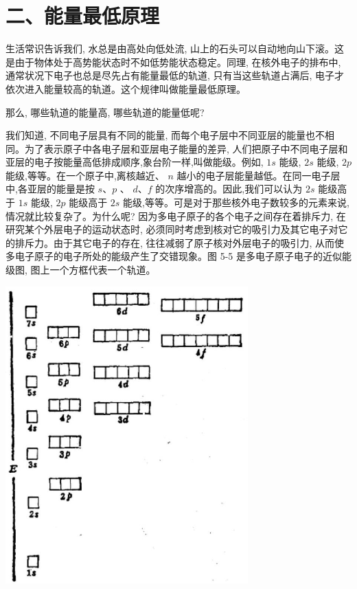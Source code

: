 \documentclass[10pt]{article}
\begin{document}
\section*{二、能量最低原理}

生活常识告诉我们, 水总是由高处向低处流, 山上的石头可以自动地向山下滚。这是由于物体处于高势能状态时不如低势能状态稳定。同理, 在核外电子的排布中, 通常状况下电子也总是尽先占有能量最低的轨道, 只有当这些轨道占满后, 电子才依次进入能量较高的轨道。这个规律叫做能量最低原理。

那么, 哪些轨道的能量高, 哪些轨道的能量低呢?

我们知道, 不同电子层具有不同的能量, 而每个电子层中不同亚层的能量也不相同。为了表示原子中各电子层和亚层电子能量的差异, 人们把原子中不同电子层和亚层的电子按能量高低排成顺序,象台阶一样,叫做能级。例如, \({1s}\) 能级, \({2s}\) 能级, \({2p}\) 能级,等等。在一个原子中,离核越近、 \(n\) 越小的电子层能量越低。在同一电子层中,各亚层的能量是按 \(s\text{、}p\) 、 \(d\text{、}f\) 的次序增高的。因此,我们可以认为 \({2s}\) 能级高于 \({1s}\) 能级, \({2p}\) 能级高于 \({2s}\) 能级,等等。可是对于那些核外电子数较多的元素来说, 情况就比较复杂了。为什么呢? 因为多电子原子的各个电子之间存在着排斥力, 在研究某个外层电子的运动状态时, 必须同时考虑到核对它的吸引力及其它电子对它的排斥力。由于其它电子的存在, 往往减弱了原子核对外层电子的吸引力, 从而使多电子原子的电子所处的能级产生了交错现象。图 5-5 是多电子原子电子的近似能级图, 图上一个方框代表一个轨道。

\begin{center}
\includegraphics[max width=0.7\textwidth]{images/01912d0f-097c-7e75-8f32-4f326cd86c9f_116_160371.jpg}
\end{center}
\end{document}
